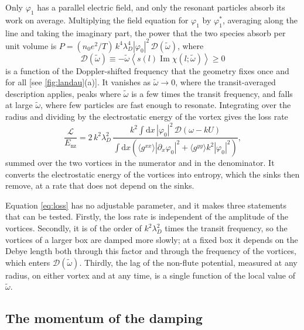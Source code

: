 \documentclass{jpp}
\newcommand{\rmd}{\text{d}}
\newcommand{\lambdaD}{\lambda_D}
\newcommand{\Enz}{E_\text{nz}}
\newcommand{\wt}{\tilde\omega}
\newcommand{\Dfn}{\mathcal{D}}
\begin{document}
Only \(\varphi_1\) has a parallel electric field, and only the resonant particles absorb its work on average. Multiplying the field equation for \(\varphi_1\) by \(\varphi_1^*\), averaging along the line and taking the imaginary part, the power that the two species absorb per unit volume is \(P = (n_0e^2/T)\,k^4\lambdaD^4|\varphi_0|^2\,\Dfn(\wt)\), where
\begin{equation}
\Dfn(\wt) \equiv -\wt\left\langle s(l)\operatorname{Im}\chi(l;\wt)\right\rangle \geq 0
\label{eq:Hdissipation}
\end{equation}
is a function of the Doppler-shifted frequency that the geometry fixes once and for all [see \cref{fig:landau}(a)]. It vanishes as \(\wt\to0\), where the transit-averaged description applies, peaks where \(\wt\) is a few times the transit frequency, and falls at large \(\wt\), where few particles are fast enough to resonate. Integrating over the radius and dividing by the electrostatic energy of the vortex gives the loss rate
\begin{equation}
\frac{\mathcal{L}}{\Enz} = 2\,k^2\lambdaD^2\,
\frac{\displaystyle k^2\int\rmd x\,|\varphi_0|^2\,\Dfn\!\left(\omega - kU\right)}
{\displaystyle\int\rmd x\left(\langle g^{xx}\rangle|\partial_x\varphi_0|^2 + \langle g^{yy}\rangle k^2|\varphi_0|^2\right)},
\label{eq:loss}
\end{equation}
summed over the two vortices in the numerator and in the denominator. It converts the electrostatic energy of the vortices into entropy, which the sinks then remove, at a rate that does not depend on the sinks.

Equation \cref{eq:loss} has no adjustable parameter, and it makes three statements that can be tested. Firstly, the loss rate is independent of the amplitude of the vortices. Secondly, it is of the order of \(k^2\lambdaD^2\) times the transit frequency, so the vortices of a larger box are damped more slowly; at a fixed box it depends on the Debye length both through this factor and through the frequency of the vortices, which enters \(\Dfn(\wt)\). Thirdly, the lag of the non-flute potential, measured at any radius, on either vortex and at any time, is a single function of the local value of \(\wt\).

\subsection{The momentum of the damping}\label{sec:momentum}
\end{document}
